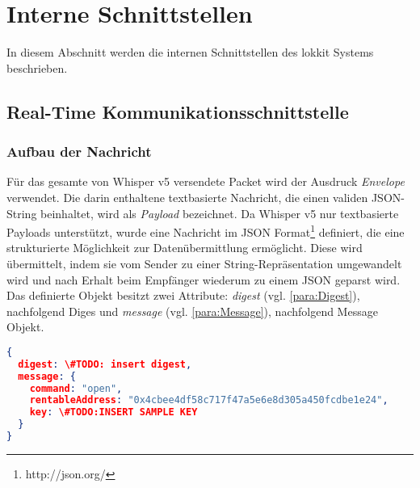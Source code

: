 \section{Interne Schnittstellen}
In diesem Abschnitt werden die internen Schnittstellen des lokkit Systems beschrieben.

\subsection{Real-Time Kommunikationsschnittstelle}
\label{sys_subsec:Real_Time_Kommunikationsschnittstelle}

\subsubsection{Aufbau der Nachricht}
Für das gesamte von Whisper v5 versendete Packet wird der Ausdruck \emph{Envelope} verwendet. Die darin enthaltene textbasierte Nachricht, die einen validen JSON-String beinhaltet, wird als \emph{Payload} bezeichnet. Da Whisper v5 nur textbasierte Payloads unterstützt, wurde eine Nachricht im JSON Format\footnote{http://json.org/} definiert, die eine strukturierte Möglichkeit zur Datenübermittlung ermöglicht. Diese wird übermittelt, indem sie vom Sender zu einer String-Repräsentation umgewandelt wird und nach Erhalt beim Empfänger wiederum zu einem JSON geparst wird. Das definierte Objekt besitzt zwei Attribute: \emph{digest} (vgl. \ref{para:Digest}), nachfolgend Diges und \emph{message} (vgl. \ref{para:Message}), nachfolgend Message Objekt. 

\begin{lstlisting}[language=json,caption={Beispiel einer lokkit JSON Nachricht}]
{
  digest: \#TODO: insert digest,
  message: {
    command: "open",
    rentableAddress: "0x4cbee4df58c717f47a5e6e8d305a450fcdbe1e24",
    key: \#TODO:INSERT SAMPLE KEY
  }
}
\end{lstlisting}

